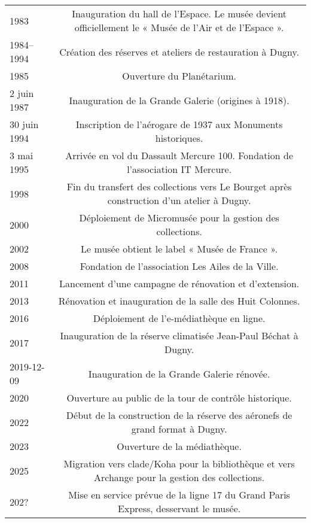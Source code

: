 \begin{longtable}{B C}
	1983 & Inauguration du hall de l'Espace. Le musée devient officiellement le « Musée de l'Air et de l'Espace ». \\
	 1984--1994 & Création des réserves et ateliers de restauration à Dugny. \\
	 1985 & Ouverture du Planétarium. \\
	 2 juin 1987 & Inauguration de la Grande Galerie (origines à 1918). \\
	 30 juin 1994 & Inscription de l'aérogare de 1937 aux Monuments historiques. \\
	 3 mai 1995 & Arrivée en vol du Dassault Mercure 100. Fondation de l'association IT Mercure. \\
	 1998 & Fin du transfert des collections vers Le Bourget après construction d'un atelier à Dugny. \\
	 2000 & Déploiement de Micromusée pour la gestion des collections. \\
	 2002 & Le musée obtient le label « Musée de France ». \\
	 2008 & Fondation de l'association Les Ailes de la Ville. \\
	
	
	2011 & Lancement d'une campagne de rénovation et d'extension. \\
	2013 & Rénovation et inauguration de la salle des Huit Colonnes. \\
	2016 & Déploiement de l'e-médiathèque en ligne. \\
	2017 & Inauguration de la réserve climatisée Jean-Paul Béchat à Dugny. \\
	2019-12-09 & Inauguration de la Grande Galerie rénovée. \\
	2020 & Ouverture au public de la tour de contrôle historique. \\
	2022 & Début de la construction de la réserve des aéronefs de grand format à Dugny. \\
	2023 & Ouverture de la médiathèque. \\
	2025 & Migration vers \gls{clade}/Koha pour la bibliothèque et vers Archange pour la gestion des collections. \\
	202? & Mise en service prévue de la ligne 17 du Grand Paris Express, desservant le musée. \\
	
\end{longtable}